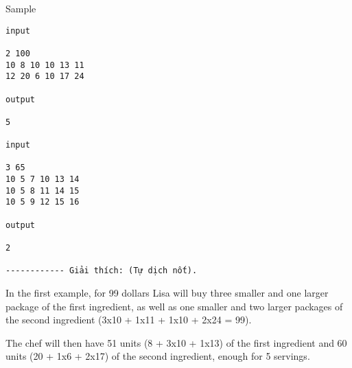 Sample
\begin{verbatim}
input 
 
2 100 
10 8 10 10 13 11 
12 20 6 10 17 24 
 
output 
 
5

input 
 
3 65 
10 5 7 10 13 14 
10 5 8 11 14 15 
10 5 9 12 15 16 
 
output 
 
2

------------ Giải thích: (Tự dịch nốt).\end{verbatim}

In the first example, for 99 dollars Lisa will buy three smaller and one larger package of the first ingredient, as well as one smaller and two larger packages of the second ingredient (3x10 + 1x11 + 1x10 + 2x24 = 99).

The chef will then have 51 units (8 + 3x10 + 1x13) of the first ingredient and 60 units (20 + 1x6 + 2x17) of the second ingredient, enough for 5 servings.